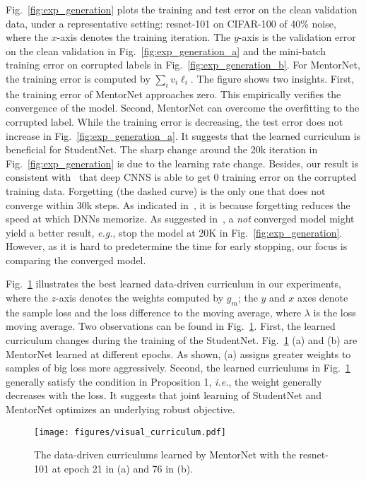 \documentclass{article}
\newcommand{\eg}{\emph{e.g.}} \newcommand{\Eg}{\emph{E.g}}
\newcommand{\ie}{\emph{i.e.}} \newcommand{\Ie}{\emph{I.e}}
\begin{document}
Fig.~\ref{fig:exp_generation} plots the training and test error on the clean validation data, under a representative setting: resnet-101 on CIFAR-100 of 40\% noise, where the $x$-axis denotes the training iteration. The $y$-axis is the validation error on the clean validation in Fig.~\ref{fig:exp_generation_a} and the mini-batch training error on corrupted labels in Fig.~\ref{fig:exp_generation_b}. For MentorNet, the training error is computed by $\sum_i v_i \ell_i$. The figure shows two insights. First, the training error of MentorNet approaches zero. This empirically verifies the convergence of the model. Second, MentorNet can overcome the overfitting to the corrupted label. While the training error is decreasing, the test error does not increase in Fig.~\ref{fig:exp_generation_a}. It suggests that the learned curriculum is beneficial for StudentNet. The sharp change around the 20k iteration in Fig.~\ref{fig:exp_generation} is due to the learning rate change. Besides, our result is consistent with~\cite{zhang2017understanding} that deep CNNS is able to get 0 training error on the corrupted training data. Forgetting (the dashed curve) is the only one that does not converge within 30k steps. As indicated in~\cite{arpit2017closer}, it is because forgetting reduces the speed at which DNNs memorize. As suggested in~\cite{zhang2017mixup}, a \emph{not} converged model might yield a better result, \eg, stop the model at 20K in Fig.~\ref{fig:exp_generation}. However, as it is hard to predetermine the time for early stopping, our focus is comparing the converged model. 


Fig.~\ref{fig:visual_curriculum} illustrates the best learned data-driven curriculum in our experiments, where the $z$-axis denotes the weights computed by $g_m$; the $y$ and $x$ axes denote the sample loss and the loss difference to the moving average, where $\lambda$ is the loss moving average. Two observations can be found in Fig.~\ref{fig:visual_curriculum}. First, the learned curriculum changes during the training of the StudentNet. Fig.~\ref{fig:visual_curriculum} (a) and (b) are MentorNet learned at different epochs. As shown, (a) assigns greater weights to samples of big loss more aggressively. Second, the learned curriculums in Fig.~\ref{fig:visual_curriculum} generally satisfy the condition in Proposition 1, \ie, the weight generally decreases with the loss. It suggests that joint learning of StudentNet and MentorNet optimizes an underlying robust objective.

\begin{figure}[ht]
\vspace{-1mm}
\texttt{[image: figures/visual\_curriculum.pdf]}
\vspace{-6mm}
\caption{\label{fig:visual_curriculum} The data-driven curriculums learned by MentorNet with the resnet-101 at epoch 21 in (a) and 76 in (b).}
\vspace{-5mm}
\end{figure}
\end{document}
